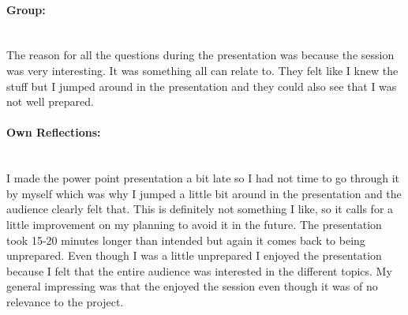 \paragraph{Group:}~\\ The reason for all the questions during the presentation was because the session was very interesting. It was something all can relate to. They felt like I knew the stuff but I jumped around in the presentation and they could also see that I was not well prepared.
\paragraph{Own Reflections:}~\\
I made the power point presentation a bit late so I had not time to go through it by myself which was why I jumped a little bit around in the presentation and the audience clearly felt that. This is definitely not something I like, so it calls for a little improvement on my planning to avoid it in the future. The presentation took 15-20 minutes longer than intended but again it comes back to being unprepared. Even though I was a little unprepared I enjoyed the presentation because I felt that the entire audience was interested in the different topics. My general impressing was that the enjoyed the session even though it was of no relevance to the project.